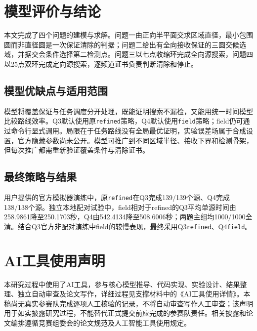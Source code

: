 \documentclass[UTF8,fontset=fandol,a4paper,zihao=-4]{ctexart}
\begin{document}
\section{模型评价与结论}

本文完成了四个问题的建模与求解。问题一由正向半平面交求区域直径，最小包围圆而非直径圆是一次保证清除的判据；问题二给出有全向接收保证的三圆交候选域，并据交会条件选择第二检测点。问题三以七点收缩环完成全向源搜索，问题四以25点双环完成定向源搜索，逐频道证书负责判断清除和停止。
\subsection{模型优缺点与适用范围}
模型将覆盖保证与任务调度分开处理，既能证明搜索不漏检，又能用统一时间模型比较路线效率。Q3默认使用原\texttt{refined}策略，Q4默认使用\texttt{field}策略；field仍可通过命令行显式调用。局限在于任务路线没有全局最优证明，实验误差场属于合成设置，官方隐藏参数尚未公开。模型可推广到不同区域半径、接收下界和检测骨架，但每次推广都需重新验证覆盖条件与清除证书。
\subsection{最终策略与结果}
用户提供的官方模拟器演练中，原\texttt{refined}在Q3完成139/139个源、Q4完成138/138个源。独立本地配对试验中，field相对于refined的Q3平均单源时间由258.9861降至250.1703秒，Q4由542.4134降至508.6006秒；两题主组均1000/1000全清。结合Q3官方非配对演练中field的较慢表现，最终采用Q3\texttt{refined}、Q4\texttt{field}。

\section*{AI工具使用声明}
本研究过程中使用了AI工具，参与核心模型推导、代码实现、实验设计、结果整理、独立自动审查及论文写作，详细过程见支撑材料中的《AI工具使用详情》。本稿尚无真实参赛队完成逐项人工核验的记录，不将自动审查写作人工审查；该声明用于如实披露研究过程，不能替代正式提交前应完成的参赛队责任。相关披露和论文编排遵循竞赛组委会的论文规范及人工智能工具使用规定\cite{format,airule}。
\end{document}
